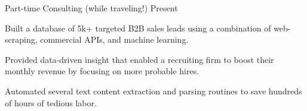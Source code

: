 
\begin{cventries}

  \cventrynew
	{Part-time Consulting (while traveling!)}    
    {Present} 
    {}
    {
    \begin{cvitems}
		 \item {Built a database of 5k+ targeted B2B sales leads using a combination of web-scraping, commercial APIs, and machine learning.}
		 \item {Provided data-driven insight that enabled a recruiting firm to boost their monthly revenue by focusing on more probable hires.}		 
		 \item {Automated several text content extraction and parsing routines to save hundreds of hours of tedious labor.}
      \end{cvitems}
    } 


\end{cventries}

